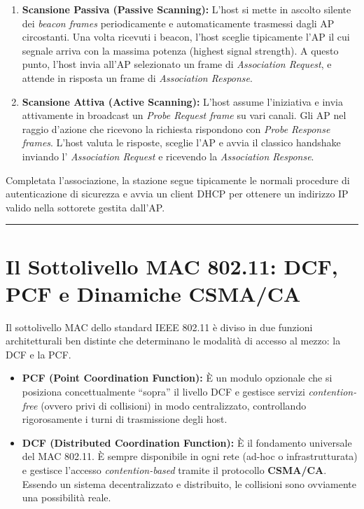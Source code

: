 \documentclass[
  italian,
  openany]{book}
\begin{document}
\begin{enumerate}
\def\labelenumi{\arabic{enumi}.}
\item
  \textbf{Scansione Passiva (Passive Scanning):} L'host si mette in
  ascolto silente dei \emph{beacon frames} periodicamente e
  automaticamente trasmessi dagli AP circostanti. Una volta ricevuti i
  beacon, l'host sceglie tipicamente l'AP il cui segnale arriva con la
  massima potenza (highest signal strength). A questo punto, l'host
  invia all'AP selezionato un frame di \emph{Association Request}, e
  attende in risposta un frame di \emph{Association Response}.
\item
  \textbf{Scansione Attiva (Active Scanning):} L'host assume
  l'iniziativa e invia attivamente in broadcast un \emph{Probe Request
  frame} su vari canali. Gli AP nel raggio d'azione che ricevono la
  richiesta rispondono con \emph{Probe Response frames}. L'host valuta
  le risposte, sceglie l'AP e avvia il classico handshake inviando l'
  \emph{Association Request} e ricevendo la \emph{Association Response}.
\end{enumerate}

Completata l'associazione, la stazione segue tipicamente le normali
procedure di autenticazione di sicurezza e avvia un client DHCP per
ottenere un indirizzo IP valido nella sottorete gestita dall'AP.

\begin{center}\rule{0.5\linewidth}{0.5pt}\end{center}

\section{Il Sottolivello MAC 802.11: DCF, PCF e Dinamiche
CSMA/CA}\label{il-sottolivello-mac-802.11-dcf-pcf-e-dinamiche-csmaca}

Il sottolivello MAC dello standard IEEE 802.11 è diviso in due funzioni
architetturali ben distinte che determinano le modalità di accesso al
mezzo: la DCF e la PCF.

\begin{itemize}
\item
  \textbf{PCF (Point Coordination Function):} È un modulo opzionale che
  si posiziona concettualmente ``sopra'' il livello DCF e gestisce
  servizi \emph{contention-free} (ovvero privi di collisioni) in modo
  centralizzato, controllando rigorosamente i turni di trasmissione
  degli host.
\item
  \textbf{DCF (Distributed Coordination Function):} È il fondamento
  universale del MAC 802.11. È sempre disponibile in ogni rete (ad-hoc o
  infrastrutturata) e gestisce l'accesso \emph{contention-based} tramite
  il protocollo \textbf{CSMA/CA}. Essendo un sistema decentralizzato e
  distribuito, le collisioni sono ovviamente una possibilità reale.
\end{itemize}
\end{document}
